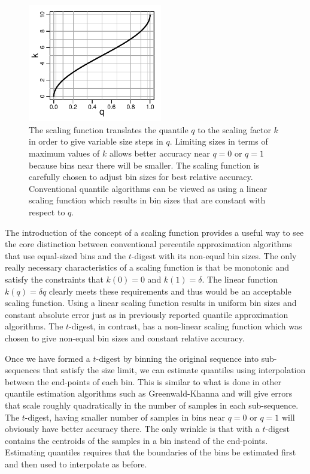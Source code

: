 \documentclass[11pt]{amsart}
\begin{document}
\begin{figure}[htbp] %
   \centering
   \includegraphics[width=2.3in]{k-q-plot.pdf} 
   \caption{The scaling function translates the quantile $q$ to the scaling factor $k$ in order to give variable size steps in $q$. Limiting sizes in terms of maximum values of $k$ allows better accuracy near $q=0$ or $q=1$ because bins near there will be smaller. The scaling function is carefully chosen to adjust bin sizes for best relative accuracy. Conventional quantile algorithms can be viewed as using a linear scaling function which results in bin sizes that are constant with respect to $q$.}
   \label{fig:k-q-plot}
\end{figure}
The introduction of the concept of a scaling function provides a useful way to see the core distinction between conventional percentile approximation algorithms that use equal-sized bins and the $t$-digest with its non-equal bin sizes. The only really necessary characteristics of a scaling function is that be monotonic and satisfy the constraints that $k(0)=0$ and $k(1)=\delta$. The linear function $k(q) = \delta q$ clearly meets these requirements and thus would be an acceptable scaling function. Using a linear scaling function results in uniform bin sizes and constant absolute error just as in previously reported quantile approximation algorithms. The $t$-digest, in contrast, has a non-linear scaling function which was chosen to give non-equal bin sizes and constant relative accuracy.

Once we have formed a $t$-digest by binning the original sequence into sub-sequences that satisfy the size limit, we can estimate quantiles using interpolation between the end-points of each bin. This is similar to what is done in other quantile estimation algorithms such as Greenwald-Khanna and will give errors that scale roughly quadratically in the number of samples in each sub-sequence. The $t$-digest, having smaller number of samples in bins near $q=0$ or $q=1$ will obviously have better accuracy there. The only wrinkle is that with a $t$-digest contains the centroids of the samples in a bin instead of the end-points. Estimating quantiles requires that the boundaries of the bins be estimated first and then used to interpolate as before. 
\end{document}
